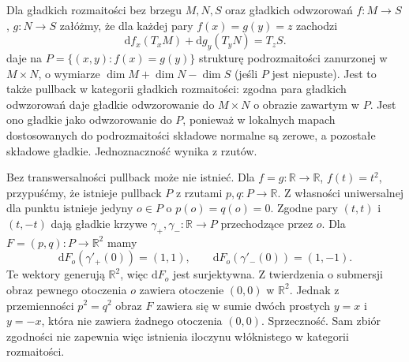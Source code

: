 \begin{przyklad}\label{cat:ex:manifold-pullback}
Dla gładkich rozmaitości bez brzegu $M,N,S$ oraz gładkich odwzorowań $f:M\to S$, $g:N\to S$ załóżmy, że dla każdej pary $f(x)=g(y)=z$ zachodzi
\[
\mathrm df_x(T_xM)+\mathrm dg_y(T_yN)=T_zS.
\]
 daje na $P=\{(x,y):f(x)=g(y)\}$ strukturę podrozmaitości zanurzonej w $M\times N$, o wymiarze $\dim M+\dim N-\dim S$ (jeśli $P$ jest niepuste). Jest to także pullback w kategorii gładkich rozmaitości: zgodna para gładkich odwzorowań daje gładkie odwzorowanie do $M\times N$ o obrazie zawartym w $P$. Jest ono gładkie jako odwzorowanie do $P$, ponieważ w lokalnych mapach dostosowanych do podrozmaitości składowe normalne są zerowe, a pozostałe składowe gładkie. Jednoznaczność wynika z rzutów.

Bez transwersalności pullback może nie istnieć. Dla $f=g:\mathbb R\to\mathbb R$, $f(t)=t^2$, przypuśćmy, że istnieje pullback $P$ z rzutami $p,q:P\to\mathbb R$. Z własności uniwersalnej dla punktu istnieje jedyny $o\in P$ o $p(o)=q(o)=0$. Zgodne pary $(t,t)$ i $(t,-t)$ dają gładkie krzywe $\gamma_+,\gamma_-:\mathbb R\to P$ przechodzące przez $o$. Dla $F=(p,q):P\to\mathbb R^2$ mamy
\[
\mathrm dF_o(\gamma'_+(0))=(1,1),\qquad
\mathrm dF_o(\gamma'_-(0))=(1,-1).
\]
Te wektory generują $\mathbb R^2$, więc $\mathrm dF_o$ jest surjektywna. Z twierdzenia o submersji obraz pewnego otoczenia $o$ zawiera otoczenie $(0,0)$ w $\mathbb R^2$. Jednak z przemienności $p^2=q^2$ obraz $F$ zawiera się w sumie dwóch prostych $y=x$ i $y=-x$, która nie zawiera żadnego otoczenia $(0,0)$. Sprzeczność. Sam zbiór zgodności nie zapewnia więc istnienia iloczynu włóknistego w kategorii rozmaitości.
\end{przyklad}

